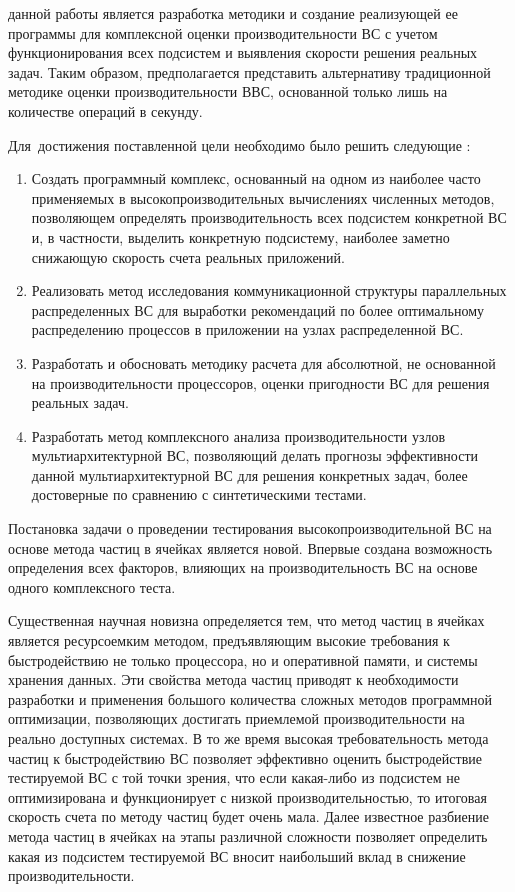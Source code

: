 {\aim} данной работы является разработка методики и создание реализующей ее программы для комплексной оценки производительности ВС с учетом функционирования всех подсистем  и выявления скорости решения реальных задач. Таким образом, предполагается представить альтернативу традиционной методике оценки производительности ВВС, основанной только лишь на количестве операций в секунду.  

Для~достижения поставленной цели необходимо было решить следующие {\tasks}:
\begin{enumerate}
	\item Создать программный комплекс, основанный на одном из наиболее часто применяемых в высокопроизводительных вычислениях численных методов, позволяющем определять производительность всех подсистем конкретной ВС и, в частности, выделить конкретную подсистему, наиболее заметно снижающую скорость счета реальных приложений. 
	
	\item Реализовать метод исследования коммуникационной структуры параллельных распределенных ВС для выработки рекомендаций по более оптимальному распределению процессов в приложении на узлах распределенной ВС.
	
	\item Разработать и обосновать методику расчета для абсолютной, не основанной на производительности процессоров, оценки пригодности ВС для решения реальных задач. 
	
	\item Разработать метод комплексного анализа производительности узлов мультиархитектурной ВС, позволяющий делать прогнозы эффективности данной мультиархитектурной ВС для решения конкретных задач, более достоверные по сравнению с синтетическими тестами.
\end{enumerate}

{\novelty}
Постановка задачи о проведении тестирования высокопроизводительной ВС на основе метода частиц в ячейках является новой. Впервые создана возможность определения всех факторов, влияющих на производительность ВС на основе одного комплексного теста. 

Существенная научная новизна определяется тем, что метод частиц в ячейках является ресурсоемким методом, предъявляющим высокие требования к быстродействию не только процессора, но и оперативной памяти, и системы хранения данных. Эти свойства метода частиц приводят к необходимости разработки и применения большого количества сложных методов программной оптимизации, позволяющих достигать приемлемой производительности на реально доступных системах. В то же время высокая требовательность метода частиц к быстродействию ВС позволяет эффективно оценить быстродействие тестируемой ВС с той точки зрения, что если какая-либо из подсистем не оптимизирована и функционирует с низкой производительностью, то итоговая скорость счета по методу частиц будет очень мала.
 Далее известное разбиение метода частиц в ячейках на этапы различной сложности позволяет определить какая из подсистем тестируемой ВС вносит наибольший вклад в снижение производительности. 

